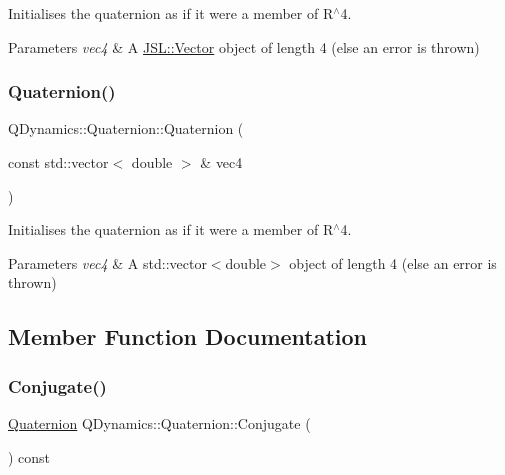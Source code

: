 Initialises the quaternion as if it were a member of R$^\wedge$4. 


\begin{DoxyParams}{Parameters}
{\em vec4} & A \hyperlink{classJSL_1_1Vector}{J\+S\+L\+::\+Vector} object of length 4 (else an error is thrown) \\
\hline
\end{DoxyParams}
\mbox{\label{classQDynamics_1_1Quaternion_ad0da33a229eb9869a4b48c8302f5470e}} 
\subsubsection{\texorpdfstring{Quaternion()}{Quaternion()}\hspace{0.1cm}{\footnotesize\ttfamily [5/5]}}
{\footnotesize\ttfamily Q\+Dynamics\+::\+Quaternion\+::\+Quaternion (\begin{DoxyParamCaption}\item[{const std\+::vector$<$ double $>$ \&}]{vec4 }\end{DoxyParamCaption})\hspace{0.3cm}{\ttfamily [inline]}}



Initialises the quaternion as if it were a member of R$^\wedge$4. 


\begin{DoxyParams}{Parameters}
{\em vec4} & A std\+::vector$<$double$>$ object of length 4 (else an error is thrown) \\
\hline
\end{DoxyParams}


\subsection{Member Function Documentation}
\mbox{\label{classQDynamics_1_1Quaternion_a2516e87ebb14ee2d34bc22744057c87b}} 
\subsubsection{\texorpdfstring{Conjugate()}{Conjugate()}}
{\footnotesize\ttfamily \hyperlink{classQDynamics_1_1Quaternion}{Quaternion} Q\+Dynamics\+::\+Quaternion\+::\+Conjugate (\begin{DoxyParamCaption}{ }\end{DoxyParamCaption}) const\hspace{0.3cm}{\ttfamily [inline]}}



